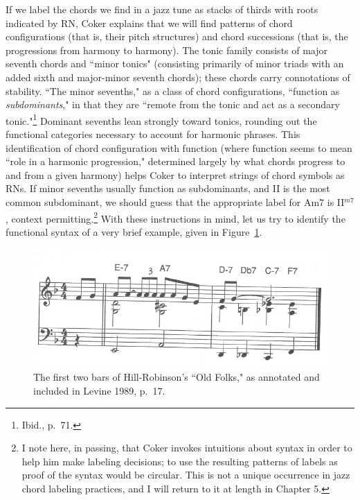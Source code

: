 If we label the chords we find in a jazz tune as stacks of thirds with roots indicated by RN, Coker explains that we will find patterns of chord configurations (that is, their pitch structures) and chord successions (that is, the progressions from harmony to harmony).  The tonic family consists of major seventh chords and ``minor tonics" (consisting primarily of minor triads with an added sixth and major-minor seventh chords); these chords carry connotations of stability.  ``The minor sevenths," as a class of chord configurations, ``function as \emph{subdominants}," in that they are ``remote from the tonic and act as a secondary tonic."\footnote{Ibid., p.\ 71.}  Dominant sevenths lean strongly toward tonics, rounding out the functional categories necessary to account for harmonic phrases.  This identification of chord configuration with function (where function seems to mean ``role in a harmonic progression," determined largely by what chords progress to and from a given harmony) helps Coker to interpret strings of chord symbols as RNs.  If minor sevenths usually function as subdominants, and II is the most common subdominant, we should guess that the appropriate label for Am7 is II$^{m7}$, context permitting.\footnote{I note here, in passing, that Coker invokes intuitions about syntax in order to help him make labeling decisions; to use the resulting patterns of labels as proof of the syntax would be circular.  This is not a unique occurrence in jazz chord labeling practices, and I will return to it at length in Chapter 5.}  With these instructions in mind, let us try to identify the functional syntax of a very brief example, given in Figure~\ref{levine_folks}.
\begin{figure}
	\centering
	\caption{The first two bars of Hill-Robinson's ``Old Folks," as annotated and included in Levine 1989, p.\ 17.}
	\label{levine_folks}
	\includegraphics[width=5in]{levine_31.png}
\end{figure}

